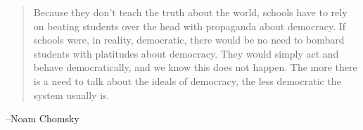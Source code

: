 \documentclass[letterpaper, landscape]{exam}
\begin{document}
  \else
    \vspace{10 cm}
    \begin{quote}
      \begin{em}
        Because they don't teach the truth about the world, schools have to rely on
        beating students over the head with propaganda about democracy. If schools were,
        in reality, democratic, there would be no need to bombard students with
        platitudes about democracy. They would simply act and behave democratically, and
        we know this does not happen. The more there is a need to talk about the ideals
        of democracy, the less democratic the system usually is.
      \end{em}
    \end{quote}
    \hspace{1 cm} --Noam Chomsky
  \fi
\end{document}
